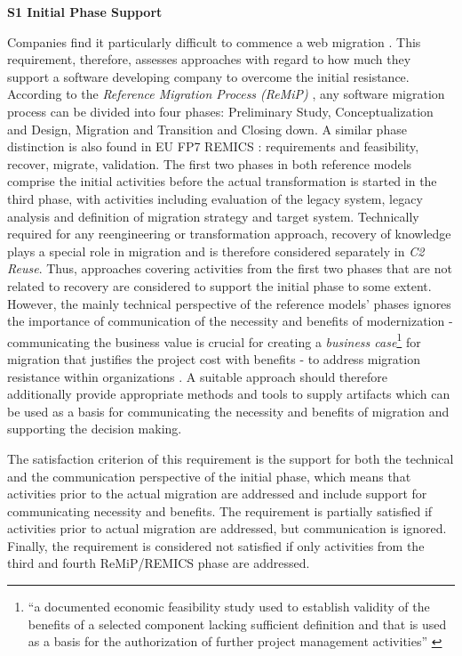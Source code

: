 \textbf{S1 Initial Phase Support}

Companies find it particularly difficult to commence a web migration \autocite{Heil2017Survey,Heil2018ReWaMP}.
This requirement, therefore, assesses approaches with regard to how much they support a software developing company to overcome the initial resistance.
According to the \emph{Reference Migration Process (ReMiP)} \autocite{Sneed2010ReMiP}, any software migration process can be divided into four phases: Preliminary Study, Conceptualization and Design, Migration and Transition and Closing down.
A similar phase distinction is also found in EU FP7 REMICS \autocite{Krasteva2013REMICSAgile}: requirements and feasibility, recover, migrate, validation.
The first two phases in both reference models comprise the initial activities before the actual transformation is started in the third phase, with activities including evaluation of the legacy system, legacy analysis and definition of migration strategy and target system.
Technically required for any reengineering or transformation approach, recovery of knowledge plays a special role in migration and is therefore considered separately in \emph{C2 Reuse}.
Thus, approaches covering activities from the first two phases that are not related to recovery are considered to support the initial phase to some extent.
However, the mainly technical perspective of the reference models' phases ignores the importance of communication of the necessity and benefits of modernization - communicating the business value is crucial for creating a \emph{business case}\footnote{``a documented economic feasibility study used to establish validity of the benefits of a selected component lacking sufficient definition and that is used as a basis for the authorization of further project management activities'' \autocite{ISO/IEEE24765Vocabulary}} for migration \autocite{AmazonWebServices2018Migration,Khadka2016PHD,Menychtas2014ARTISTJournal,Batlajery2014IndustrialSurveyModernization,Khadka2014ProfessionalsModernization} that justifies the project cost with benefits \autocite{Sneed1995CostBenefit} - to address migration resistance within organizations \autocite{Khadka2014ProfessionalsModernization,Sneed2010ReMiP}.
A suitable approach should therefore additionally provide appropriate methods and tools to supply artifacts which can be used as a basis for communicating the necessity and benefits of migration and supporting the decision making.

The satisfaction criterion of this requirement is the support for both the technical and the communication perspective of the initial phase, which means that activities prior to the actual migration are addressed and include support for communicating necessity and benefits.
The requirement is partially satisfied if activities prior to actual migration are addressed, but communication is ignored.
Finally, the requirement is considered not satisfied if only activities from the third and fourth ReMiP/REMICS phase are addressed.

